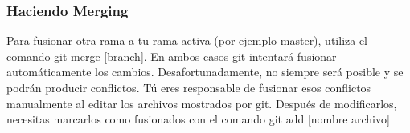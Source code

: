 \begin{frame}[fragile]
    \frametitle{Haciendo Merging}
    Para fusionar otra rama a tu rama activa (por ejemplo master), utiliza el
    comando \alert{git merge [branch]}. En ambos casos git intentar\'a
    fusionar autom\'aticamente los cambios. Desafortunadamente, no siempre 
    ser\'a posible y se podr\'an producir conflictos. 
    Tú eres responsable de fusionar esos conflictos manualmente al editar los
    archivos mostrados por git. Despu\'es de modificarlos, necesitas 
    marcarlos como fusionados con el comando \alert{git add [nombre archivo]}
\end{frame}
